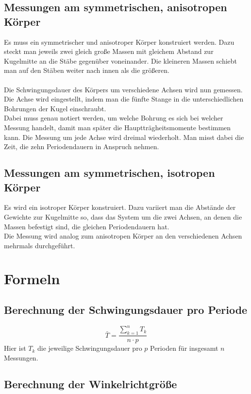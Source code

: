 \documentclass[fontsize=12pt]{scrartcl}
\begin{document}
\subsection{Messungen am symmetrischen, anisotropen Körper}
Es muss ein symmetrischer und anisotroper Körper konstruiert werden. Dazu steckt man jeweils zwei gleich große Massen mit gleichem Abstand zur Kugelmitte an die Stäbe gegenüber voneinander. Die kleineren Massen schiebt man auf den Stäben weiter nach innen als die größeren. \\~\\
Die Schwingungsdauer des Körpers um verschiedene Achsen wird nun gemessen. Die Achse wird eingestellt, indem man die fünfte Stange in die unterschiedlichen Bohrungen der Kugel einschraubt. \\
Dabei muss genau notiert werden, um welche Bohrung es sich bei welcher Messung handelt, damit man später die Hauptträgheitsmomente bestimmen kann.
Die Messung um jede Achse wird dreimal wiederholt. Man misst dabei die Zeit, die zehn Periodendauern in Anspruch nehmen.

\subsection{Messungen am symmetrischen, isotropen Körper}
Es wird ein isotroper Körper konstruiert. Dazu variiert man die Abstände der Gewichte zur Kugelmitte so, dass das System um die zwei Achsen, an denen die Massen befestigt sind, die gleichen Periodendauern hat. \\
Die Messung wird analog zum anisotropen Körper an den verschiedenen Achsen mehrmals durchgeführt.

\newpage

\section{ Formeln}
\subsection{Berechnung der Schwingungsdauer pro Periode}
\begin{equation}
\bar{T}= \frac{\sum_{k=1}^n T_k}{n \cdot p}
\end{equation}
Hier ist $T_k$ die jeweilige Schwingungsdauer pro $p$ Perioden für insgesamt $n$ Messungen.
\subsection{Berechnung der Winkelrichtgröße}
\end{document}
